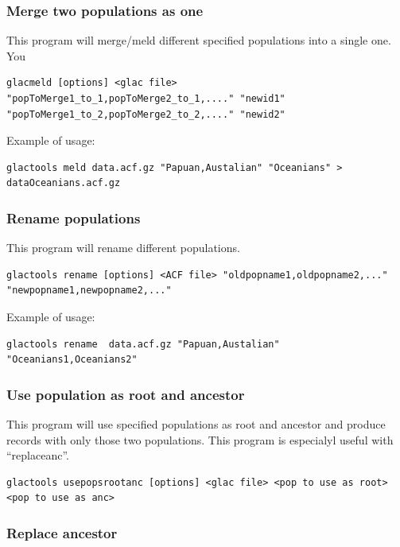 \documentclass[a4paper]{article}
\begin{document}
\subsubsection{Merge two populations as one}

\noindent This program will merge/meld different specified populations into a single one. You 

\small
\begin{lstlisting}
glacmeld [options] <glac file> "popToMerge1_to_1,popToMerge2_to_1,...." "newid1" "popToMerge1_to_2,popToMerge2_to_2,...." "newid2"
\end{lstlisting}
\normalsize

Example of usage:
\small
\begin{lstlisting}
glactools meld data.acf.gz "Papuan,Austalian" "Oceanians" > dataOceanians.acf.gz
\end{lstlisting}
\normalsize

\subsubsection{Rename populations}

\noindent This program will rename different populations.

\small
\begin{lstlisting}
glactools rename [options] <ACF file> "oldpopname1,oldpopname2,..." "newpopname1,newpopname2,..."  
\end{lstlisting}
\normalsize

Example of usage:
\begin{lstlisting}
glactools rename  data.acf.gz "Papuan,Austalian" "Oceanians1,Oceanians2"
\end{lstlisting}



\subsubsection{Use population as root and ancestor}

\noindent This program will use specified populations as root and ancestor and produce records with only those two populations. This program is especialyl useful with ``replaceanc''.

\begin{lstlisting}
glactools usepopsrootanc [options] <glac file> <pop to use as root> <pop to use as anc>
\end{lstlisting}


\subsubsection{Replace ancestor}
\end{document}
